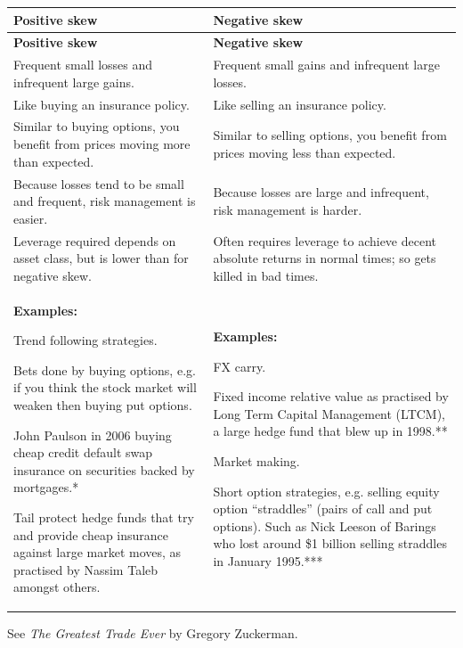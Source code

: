 \begin{longtable}{@{} p{} p{}@{}}
\toprule
\textbf{Positive skew} & \textbf{Negative skew} \\
\midrule
\endfirsthead \toprule \textbf{Positive skew} & \textbf{Negative skew} \\
\midrule
\endhead Frequent small losses and infrequent large gains. &Frequent small gains and infrequent large losses. \\
\hline
Like buying an insurance policy. &Like selling an insurance policy. \\
\hline
Similar to buying options, you benefit from prices moving more than expected. &Similar to selling options, you benefit from prices moving less than expected. \\
\hline
Because losses tend to be small and frequent, risk management is easier. &Because losses are large and infrequent, risk management is harder. \\
\hline
Leverage required depends on asset class, but is lower than for negative skew. &Often requires leverage to achieve decent absolute returns in normal times; so gets killed in bad times. \\
\hline
\textbf{Examples:}
\par Trend following strategies.
\par Bets done by buying options, e.g. if you think the stock market will weaken then buying put options.
\par John Paulson in 2006 buying cheap credit default swap insurance on securities backed by mortgages.*
\par Tail protect hedge funds that try and provide cheap insurance against large market moves, as practised by Nassim Taleb amongst others. &\textbf{Examples:}
\par FX carry.
\par Fixed income relative value as practised by Long Term Capital Management (LTCM), a large hedge fund that blew up in 1998.**
\par Market making.
\par Short option strategies, e.g. selling equity option ``straddles'' (pairs of call and put options). Such as Nick Leeson of Barings who lost around \$1 billion selling straddles in January 1995.*** \\
\bottomrule
\end{longtable}
\addtocounter{table}{-1}

\noindent * See \textit{The Greatest Trade Ever} by Gregory Zuckerman.

